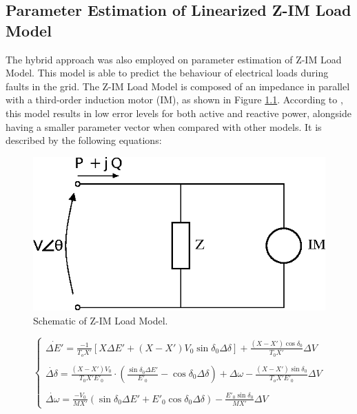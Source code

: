 
\begin{apendicesenv}
\partapendices

\chapter{Parameter Estimation of Linearized Z-IM Load Model}
\label{ch: appendix}

The hybrid approach was also employed on parameter estimation of Z-IM Load Model. This model is able to predict the behaviour of electrical loads during faults in the grid. The Z-IM Load Model is composed of an impedance in parallel with a third-order induction motor (IM), as shown in Figure \ref{img: Z-IM}. According to \cite{Choi}, this model results in low error levels for both active and reactive power, alongside having a smaller parameter vector when compared with other models. It is described by the following equations:

\begin{figure}[h]
    \caption{Schematic of Z-IM Load Model.}
    \begin{center}
    	\includegraphics[scale=1]{Images/drawZIM.eps}
    \end{center}
    \label{img: Z-IM}
\end{figure}

\begin{equation}
    \begin{cases}
        \dot{\Delta E'} = \frac{-1}{T_{o}X'}[X\Delta E' + (X - X')V_{0}\sin\delta_{0}\Delta \delta] + \frac{(X - X')\cos\delta_{0}}{T_{0}X'}\Delta V \\
        \\
        \dot{\Delta \delta} = \frac{(X-X')V_{0}}{T_{0}X'E'_{0}}\cdot\left(\frac{\sin\delta_{0}\Delta E'}{E'_0} - \cos\delta_{0}\Delta\delta\right) + \Delta\omega - \frac{(X - X')\sin\delta_0}{T_o X'E'_0}\Delta V \\
        \\
        \dot{\Delta \omega} = \frac{-V_{0}}{MX'}(\sin\delta_{0}\Delta E' + E'_{0}\cos\delta_{0}\Delta\delta) - \frac{E'_0\sin\delta_0}{MX'}\Delta V
    \end{cases}
    \label{eq: xZIM}
\end{equation}


\end{apendicesenv}
